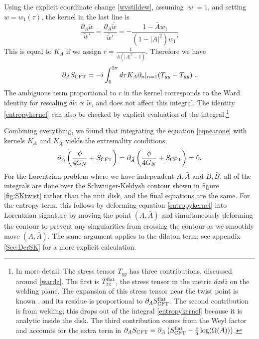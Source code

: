\documentclass[11pt,oneside,letterpaper]{article}
\newcommand{\p}{\partial}
\newcommand{\f}{\frac}
\newcommand{\be}{\begin{equation}}
\newcommand{\ee}{\end{equation}}
\def\be{\begin{eqnarray}}
\def\ee{\end{eqnarray}}
\let\l=\lambda \let\m=\mu \let\n=\nu \let\x=\xi \let\p=\phi \let\r=v
\let\f=\frac
\let\pa=\partial
\def\be{\begin{equation}}
\def\ee{\end{equation}}
\def\ba{\begin{eqnarray}}
\def\ea{\end{eqnarray}}
\renewcommand{\p}{\partial}
\numberwithin{equation}{section}
\def\m{{\mu}}
\def\n{{\nu}}
\def\p{{\phi}}
\def\be{\begin{equation}}
\def\ee{\end{equation}}
\def\ba{\begin{eqnarray}}
\def\ea{\end{eqnarray}}
\def\r{\rightarrow}
\def\f {\frac}
\def\l{\left}
\def\r{\right}
\def \bA {\bar{A}}
\def\x{\bar{x}}
\def \be {\begin{equation}}
\def \ee {\end{equation}}
\renewcommand{\p}{\partial}
\newcommand{\by}{\bar{y}}
\begin{document}
\begin{spacing}{1.1}
 Using the explicit coordinate change \eqref{wvstildew}, assuming $|w|=1$, and setting $w = w_1(\tau)$, the kernel in the last line is
\be\label{derw}
\frac{\p_A \tilde{w}}{\tilde{w}'} = \frac{\p_A \bar{ \tilde{w}}}{\bar{\tilde{w}}'} = 
-\frac{1-\bar{A}w_1}{(1-|A|^2)w_1'} 
\ee
This is equal to $K_A$ if we assign $r = \frac{1}{A(|A|^2-1)}$. Therefore we have
\be\label{entropykernel}
\p_A S_{\rm CFT} =-i \int_0^{2\pi}d\tau  K_A \p_n|_{n=1}(T_{yy} - T_{\by \by} ) \ .
\ee
The ambiguous term proportional to $r$ in the kernel corresponds to the Ward identity for rescaling $\delta \tilde{w} \propto \tilde{w}$, and does not affect this integral. The identity \eqref{entropykernel} can also be checked by explicit evaluation of the integral.\footnote{In more detail: The stress tensor $T_{yy}$ has three contributions, discussed around \eqref{wardz}. The first is $T_{zz}^{\rm flat}$, the stress tensor in the metric $dz d\bar{z}$ on the welding plane. The expansion of this stress tensor near the twist point is known \cite{Calabrese:2004eu,Calabrese:2009qy}, and its residue is proportional to $\p_{A} S_{\rm CFT}^{\rm flat}$. The second contribution is from welding; this drops out of the integral \eqref{entropykernel} because it is analytic inside the disk. The third contribution comes from the Weyl factor and accounts for the extra term in $\p_A S_{\rm CFT} = \p_A\left( S_{\rm CFT}^{\rm flat} -\f{c}{6} \log( \Omega(A) ) \right)$.}


Combining everything, we found that integrating the equation \eqref{eqnearone} with kernels $K_{A}$ and $K_{\bA}$ yields the extremality conditions,
\ba
\pa_{A} \l( \f{\phi}{4 G_N} +S_{\rm CFT} \r) = \pa_{\bA} \l(  \f{\phi}{4 G_N}+S_{\rm CFT} \r)=0.
\ea
For the Lorentzian problem where we have independent $A, \bar{A}$ and $B,\bar{B}$, all of the integrals are done over the Schwinger-Keldysh contour shown in figure \ref{fig:SKtwist} rather than the unit disk, and the final equations are the same. For the entropy term, this follows by deforming equation \eqref{entropykernel} into Lorentzian signature by moving the point $(A,\bar{A})$ and simultaneously deforming the contour to prevent any singularities from crossing the contour as we smoothly move $(A,\bar{A})$. The same argument applies to the dilaton term; see appendix \ref{Sec:DerSK} for a more explicit calculation.




\end{spacing}
\end{document}
